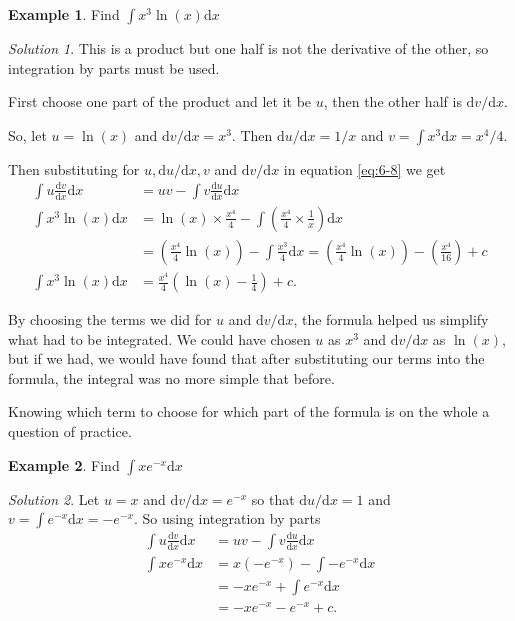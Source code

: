 \documentclass[
  english,
  11pt,
  oneside]{book}
\newcommand{\slide}{}
\theoremstyle{definition}
\theoremstyle{definition}
\newtheorem{example}{Example}[chapter]
\theoremstyle{definition}
\theoremstyle{definition}
\theoremstyle{remark}
\newtheorem*{solution}{Solution}
\begin{document}
\slide

\begin{example}
Find \(\displaystyle\int x^3\ln(x)\mathrm{d}x\)
\end{example}

\begin{solution}
This is a product but one half is not the derivative of the other, so integration by parts must be used.

First choose one part of the product and let it be \(u\), then the other half is \(\mathrm{d}v/\mathrm{d}x\).

So, let \(u = \ln(x)\) and \(\mathrm{d}v/\mathrm{d}x = x^3\). Then \(\mathrm{d}u/\mathrm{d}x = 1/x\) and \(v=\displaystyle\int x^3\mathrm{d}x = x^4/4\).

Then substituting for \(u, \mathrm{d}u/\mathrm{d}x, v\) and \(\mathrm{d}v/\mathrm{d}x\) in equation \eqref{eq:6-8} we get
\begin{align*}
\int u\frac{\mathrm{d}v}{\mathrm{d}x}\mathrm{d}x& = uv-\int v\frac{\mathrm{d}u}{\mathrm{d}x}\mathrm{d}x\\
\int x^3\ln(x)\mathrm{d}x& = \ln(x)\times \frac{x^4}{4} - \int\left(\frac{x^4}{4}\times\frac{1}{x}\right)\mathrm{d}x\\
&=\left(\frac{x^4}{4}\ln(x)\right)-\int\frac{x^3}{4}\mathrm{d}x = \left(\frac{x^4}{4}\ln(x)\right) - \left(\frac{x^4}{16}\right)+c\\
\int x^3\ln(x)\mathrm{d}x& = \frac{x^4}{4}\left(\ln(x)-\frac14\right)+c.
\end{align*}
\end{solution}

\slide

By choosing the terms we did for \(u\) and \(\mathrm{d}v/\mathrm{d}x\), the formula helped us simplify what had to be integrated. We could have chosen \(u\) as \(x^3\) and \(\mathrm{d}v/\mathrm{d}x\) as \(\ln(x)\), but if we had, we would have found that after substituting our terms into the formula, the integral was no more simple that before.

Knowing which term to choose for which part of the formula is on the whole a question of practice.

\slide

\begin{example}
Find \(\displaystyle\int xe^{-x}\mathrm{d}x\)
\end{example}

\begin{solution}
Let \(u = x\) and \(\mathrm{d}v/\mathrm{d}x=e^{-x}\) so that \(\mathrm{d}u/\mathrm{d}x = 1\) and \(v=\displaystyle\int e^{-x}\mathrm{d}x = -e^{-x}\). So using integration by parts
\begin{align*}
\int u\frac{\mathrm{d}v}{\mathrm{d}x}\mathrm{d}x& = uv-\int v\frac{\mathrm{d}u}{\mathrm{d}x}\mathrm{d}x\\
\int xe^{-x}\mathrm{d}x&=x(-e^{-x})-\int-e^{-x}\mathrm{d}x\\
&=-xe^{-x}+\int e^{-x}\mathrm{d}x\\
&=-xe^{-x}-e^{-x}+c.
\end{align*}
\end{solution}
\end{document}
